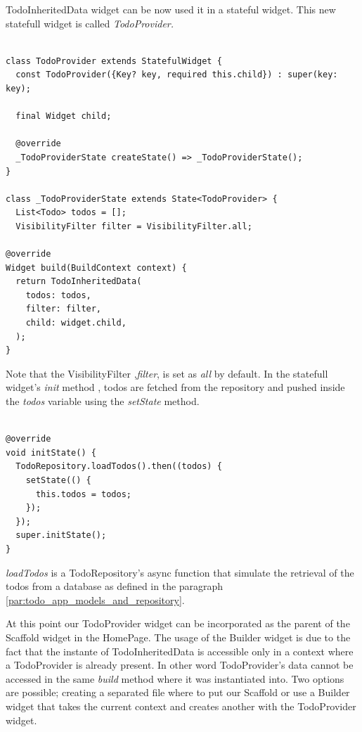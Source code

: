 TodoInheritedData widget can be now used it in a stateful widget. This new statefull widget is called \textit{TodoProvider.}

 \mbox{}

\begin{verbatim}

class TodoProvider extends StatefulWidget {
  const TodoProvider({Key? key, required this.child}) : super(key: key);

  final Widget child;

  @override
  _TodoProviderState createState() => _TodoProviderState();
}

class _TodoProviderState extends State<TodoProvider> {
  List<Todo> todos = [];
  VisibilityFilter filter = VisibilityFilter.all;

@override
Widget build(BuildContext context) {
  return TodoInheritedData(
    todos: todos,
    filter: filter,
    child: widget.child,
  );
}
\end{verbatim}

Note that the VisibilityFilter ,\textit{filter}, is set as \textit{all} by default.
In the statefull widget's \textit{init} method , todos are fetched from the repository and pushed inside the \textit{todos} variable using the \textit{setState} method.
\mbox{}\\

 \mbox{}

\begin{verbatim}

@override
void initState() {
  TodoRepository.loadTodos().then((todos) {
    setState(() {
      this.todos = todos;
    });
  });
  super.initState();
}
\end{verbatim}

\textit{loadTodos }is a TodoRepository’s async function that simulate the retrieval of the todos from a database as defined in the paragraph \ref{par:todo_app_models_and_repository}.

At this point our TodoProvider widget can be incorporated as the parent of the Scaffold widget in the HomePage. The usage of the Builder widget is due to the fact that the instante of TodoInheritedData is accessible only in a context where a TodoProvider is already present. In other word TodoProvider’s data cannot be accessed in the same \textit{build } method where it was instantiated into. Two options are possible; creating a separated file where to put our Scaffold or use a Builder widget that takes the current context and creates another with the TodoProvider widget.
\mbox{}\\


